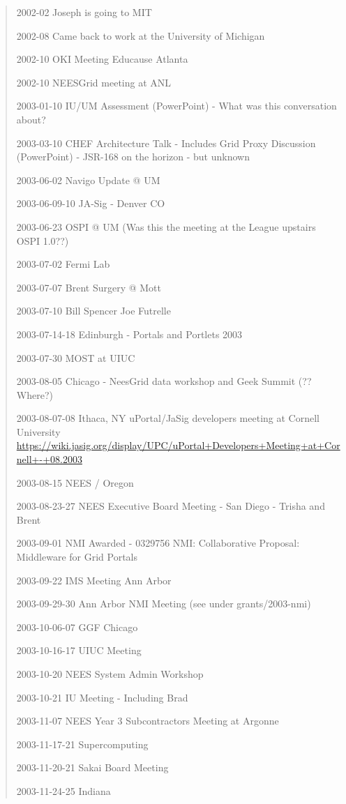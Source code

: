 \begin{quote}
2002-02 Joseph is going to MIT

2002-08 Came back to work at the University of Michigan

2002-10 OKI Meeting Educause Atlanta

2002-10  NEESGrid meeting at ANL

2003-01-10 IU/UM Assessment (PowerPoint) - What was this conversation about?

2003-03-10 CHEF Architecture Talk - Includes Grid Proxy Discussion (PowerPoint) - JSR-168 on the horizon - but unknown

2003-06-02 Navigo Update @ UM

2003-06-09-10 JA-Sig - Denver CO

2003-06-23 OSPI @ UM (Was this the meeting at the League upstairs OSPI 1.0??)

2003-07-02 Fermi Lab

2003-07-07 Brent Surgery @ Mott

2003-07-10 Bill Spencer Joe Futrelle

2003-07-14-18 Edinburgh - Portals and Portlets 2003 

2003-07-30 MOST at UIUC

2003-08-05 Chicago - NeesGrid data workshop  and Geek Summit (?? Where?)

2003-08-07-08 Ithaca, NY uPortal/JaSig developers meeting at Cornell University
\url{https://wiki.jasig.org/display/UPC/uPortal+Developers+Meeting+at+Cornell+-+08.2003}

2003-08-15 NEES / Oregon

2003-08-23-27 NEES Executive Board Meeting - San Diego - Trisha and Brent

2003-09-01 NMI Awarded - 0329756
NMI: Collaborative Proposal: Middleware for Grid Portals 

2003-09-22 IMS Meeting Ann Arbor

2003-09-29-30 Ann Arbor NMI Meeting (see under grants/2003-nmi)

2003-10-06-07 GGF Chicago

2003-10-16-17 UIUC Meeting

2003-10-20 NEES System Admin Workshop

2003-10-21 IU Meeting - Including Brad

2003-11-07 NEES Year 3 Subcontractors Meeting at Argonne

2003-11-17-21 Supercomputing

2003-11-20-21 Sakai Board Meeting

2003-11-24-25 Indiana


\end{quote}

